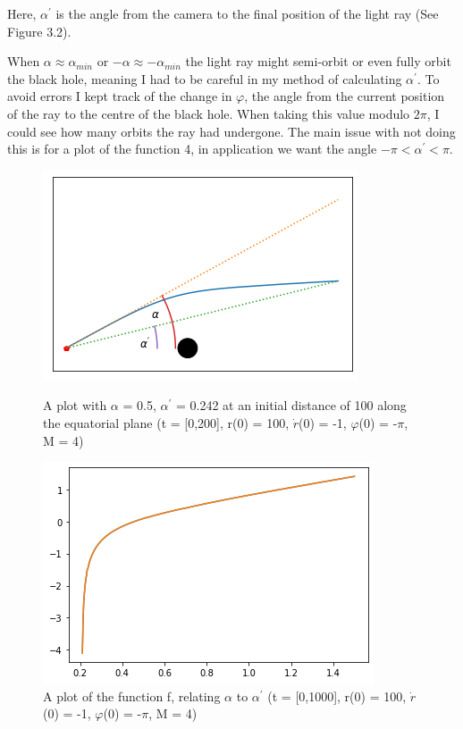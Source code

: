 \documentclass[oneside,openright,frontopenright]{dmathesis}
\begin{document}
	Here,  $\alpha^{'}$ is the angle from the camera to the final position of the light ray (See Figure 3.2).

	When $\alpha \approx \alpha_{min}$ or $-\alpha \approx -\alpha_{min}$ the light ray might semi-orbit or even fully orbit the black hole, meaning I had to be careful in my method  of calculating $\alpha^{'}$. To avoid errors I kept track of the change in $\varphi$, the angle from the current position of the ray to the centre of the black hole. When taking this value modulo $2\pi$, I could see how many orbits the ray had undergone. The main issue with not doing this is for a plot of the function 4, in application we want the angle $-\pi<\alpha^{'}<\pi$.

\begin{figure}
	\centering
	\begin{minipage}[b]{0.6\textwidth}
		\includegraphics[width=\textwidth]{img/alpha_alpha-prime}
		\caption{A plot with $\alpha$ = 0.5, $\alpha^{'}$ = 0.242 at an initial distance of 100 along the equatorial plane (t = [0,200], r(0) = 100, $\dot{r}$(0) = -1, $\varphi$(0) = -$\pi$, M = 4)}
	\end{minipage}
	\hfill
	\begin{minipage}[b]{0.6\textwidth}
		\includegraphics[width=\textwidth]{img/alpha-prime_f(alpha)}
		\caption{A plot of the function f, relating $\alpha$ to $\alpha^{'}$ (t = [0,1000], r(0) = 100, $\dot{r}$(0) = -1, $\varphi$(0) = -$\pi$, M = 4)}
	\end{minipage}
\end{figure}
\end{document}
